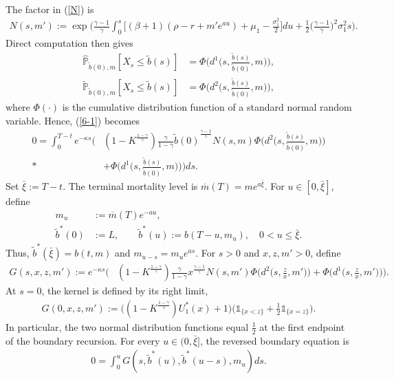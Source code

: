 \documentclass[a4paper,11pt]{amsart}
\numberwithin{equation}{section}
\newcommand{\blue}[1]{{\color{black}#1}}
\begin{document}
{{\begin{align*}
\end{align*}
The factor in (\ref{N}) is
\begin{align*}
N(s,m'):=\exp\bigg(\frac{\gamma-1}{\gamma}\int^s_0\Big[(\beta+1)(\rho-r+m'e^{au})+\mu_1-\frac{\sigma_1^2}{2}\Big]du+\frac{1}{2}\Big(\frac{\gamma-1}{\gamma}\Big)^2\sigma_1^2s\bigg).
\end{align*}
Direct computation then gives
\begin{align*}
\widehat{\mathbb{P}}_{\widetilde{b}(0),m}[X_s\leq\widetilde{b}(s)]&=\Phi\bigg(d^1\Big(s,\frac{\widetilde{b}(s)}{\widetilde{b}(0)},m\Big)\bigg),\\
\widetilde{\mathbb{P}}_{\widetilde{b}(0),m}[X_s\leq\widetilde{b}(s)]&=\Phi\bigg(d^2\Big(s,\frac{\widetilde{b}(s)}{\widetilde{b}(0)},m\Big)\bigg),
\end{align*}
where $\Phi(\cdot)$ is the cumulative distribution function of a standard normal random variable. Hence, (\ref{6-1}) becomes
\begin{align*}
0=\int^{T-t}_0e^{-\kappa s}\bigg(&(1-K^{\frac{1-\gamma}{\gamma}})\frac{\gamma}{1-\gamma}{\widetilde{b}(0)}^{\frac{\gamma-1}{\gamma}}N(s,m)\Phi\bigg(d^2\Big(s,\frac{\widetilde{b}(s)}{\widetilde{b}(0)},m\Big)\bigg)\\*
&+\Phi\bigg(d^1\Big(s,\frac{\widetilde{b}(s)}{\widetilde{b}(0)},m\Big)\bigg)\bigg)ds.
\end{align*}
\blue{Set $\bar\xi:=T-t$. The terminal mortality level is $\overline m(T)=me^{a\bar\xi}$. For $u\in[0,\bar\xi]$, define}
{\color{black}
\begin{align*}
m_u&:=\overline m(T)e^{-au},\\
\widetilde b^\ast(0)&:=L,\qquad \widetilde b^\ast(u):=b(T-u,m_u),\quad 0<u\leq\bar\xi.
\end{align*}
}
Thus, $\widetilde b^\ast(\bar\xi)=b(t,m)$ and $m_{u-s}=m_ue^{as}$. For $s>0$ and $x,z,m'>0$, define
\begin{align*}
G(s,x,z,m'):=e^{-\kappa s}\bigg(&(1-K^{\frac{1-\gamma}{\gamma}})\frac{\gamma}{1-\gamma}x^{\frac{\gamma-1}{\gamma}}N(s,m')\Phi\bigg(d^2\Big(s,\frac{z}{x},m'\Big)\bigg)+\Phi\bigg(d^1\Big(s,\frac{z}{x},m'\Big)\bigg)\bigg).
\end{align*}
At $s=0$, the kernel is defined by its right limit,
\begin{align*}
G(0,x,z,m'):=\Big((1-K^{\frac{1-\gamma}{\gamma}})U_1^\ast(x)+1\Big)\bigg(\mathds{1}_{\{x<z\}}+\frac{1}{2}\mathds{1}_{\{x=z\}}\bigg).
\end{align*}
In particular, the two normal distribution functions equal $\frac{1}{2}$ at the first endpoint of the boundary recursion. For every $u\in(0,\bar\xi]$, the reversed boundary equation is
\begin{align}\label{6-2}
0=\int^u_0G(s,\widetilde b^\ast(u),\widetilde b^\ast(u-s),m_u)ds.
\end{align}
}


}
\end{document}
